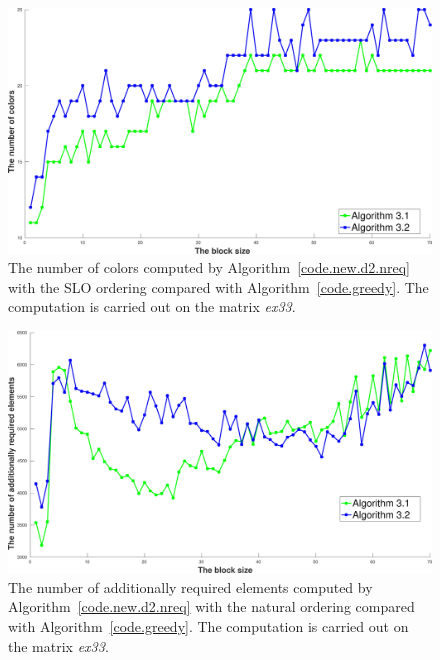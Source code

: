 \documentclass[12pt, twoside,a4paper,toc=bibliography]{scrbook}
\newcommand{\coderef}[1]{Algorithm~\protect\ref{#1}}
\begin{document}
\begin{figure}
\centering
\includegraphics[width=0.9\linewidth]{ex33_alg31_alg32_bls_slo_cols}
\caption{The number of colors computed by \coderef{code.new.d2.nreq} with the SLO ordering
compared with \coderef{code.greedy}.
The computation is carried out on the matrix \textit{ex33}.}
\label{ex33_alg31_alg32_bls_slo_cols}
\end{figure}

\begin{figure}
\centering
\includegraphics[width=0.9\linewidth]{ex33_alg31_alg32_bls_nat_add}
\caption{The number of additionally required elements computed by
\coderef{code.new.d2.nreq} with the natural ordering
compared with \coderef{code.greedy}.
The computation is carried out on the matrix \textit{ex33}. }
\label{ex33_alg31_alg32_bls_nat_add}
\end{figure}
\end{document}
